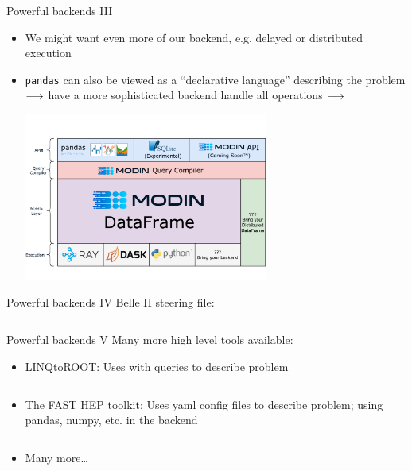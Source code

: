 \begin{frame}{Powerful backends III}
	\begin{itemize}
		\item We might want even more of our backend, e.g. delayed or distributed execution
		\item \texttt{pandas} can also be viewed as a \enquote{declarative language} describing the problem $\longrightarrow$ have a more sophisticated backend handle all operations $\longrightarrow$ 
		
		\includegraphics[width=8cm, trim=0cm 2.5cm 0cm 2.5cm, clip]{figures/paradigms/dp/modin_architecture.png}
	\end{itemize}
\end{frame}
%
\begin{frame}{Powerful backends IV}
	Belle II steering file:
	\inputminted{python}{code/paradigms/dp/belle2_steering_file.py}
\end{frame}
%
\begin{frame}{Powerful backends V}
	Many more high level tools available:
	\smallskip 
	\begin{itemize}
		\item LINQtoROOT: Uses  with   queries to describe problem
		\inputminted[fontsize=\small]{csharp}{code/paradigms/dp/linqtoroot.cs}
		\item The FAST HEP toolkit: Uses yaml config files to describe problem; using pandas, numpy, etc. in the backend
		\inputminted[fontsize=\small]{yaml}{code/paradigms/dp/fast.yaml}
		\item Many more\dots
	\end{itemize}
\end{frame}